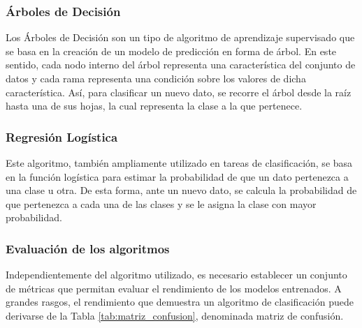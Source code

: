 \subsubsection{Árboles de Decisión}
\label{sec:arboles_decision}

Los Árboles de Decisión son un tipo de algoritmo de aprendizaje supervisado que se basa en la creación de un modelo de predicción en forma de árbol.
En este sentido, cada nodo interno del árbol representa una característica del conjunto de datos y cada rama representa una condición sobre los valores de dicha característica.
Así, para clasificar un nuevo dato, se recorre el árbol desde la raíz hasta una de sus hojas, la cual representa la clase a la que pertenece.

\subsubsection{Regresión Logística}
\label{sec:regresion_logistica}

Este algoritmo, también ampliamente utilizado en tareas de clasificación, se basa en la
función logística para estimar la probabilidad de que un dato pertenezca a una clase u otra. De esta forma, ante un nuevo dato, se calcula la probabilidad
de que pertenezca a cada una de las clases y se le asigna la clase con mayor probabilidad.

\subsubsection{Evaluación de los algoritmos}
\label{sec:evaluacion_algoritmos}

Independientemente del algoritmo utilizado, es necesario establecer un conjunto de métricas que permitan evaluar el rendimiento
de los modelos entrenados. A grandes rasgos, el rendimiento que demuestra un algoritmo de clasificación puede derivarse de la Tabla \ref{tab:matriz_confusion},
denominada matriz de confusión.

\bigskip
\begin{table}[H]
	\centering
	\caption{Matriz de confusión}
	\label{tab:matriz_confusion}
\end{table}


